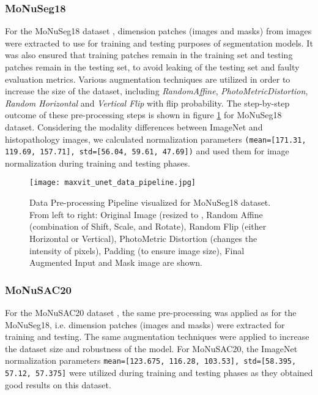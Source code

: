 \documentclass{article}
\begin{document}
\subsubsection{MoNuSeg18}

For the MoNuSeg18 dataset \cite{kumar2019multi},  dimension patches (images and masks) from  images were extracted to use for training and testing purposes of segmentation models. It was also ensured that training patches remain in the training set and testing patches remain in the testing set, to avoid leaking of the testing set and faulty evaluation metrics. Various augmentation techniques are utilized in order to increase the size of the dataset, including \textit{RandomAffine}, \textit{PhotoMetricDistortion}, \textit{Random Horizontal} and \textit{Vertical Flip} with  flip probability. The step-by-step outcome of these pre-processing steps is shown in figure \ref{fig:data-pipeline} for MoNuSeg18 \cite{kumar2019multi} dataset. Considering the modality differences between ImageNet and histopathology images, we calculated normalization parameters \texttt{(mean=[171.31, 119.69, 157.71], std=[56.04, 59.61, 47.69])} and used them for image normalization during training and testing phases.

\begin{figure}[ht!]
    \centering
    \texttt{[image: maxvit\_unet\_data\_pipeline.jpg]}
    \caption{Data Pre-processing Pipeline visualized for MoNuSeg18 dataset. From left to right: Original Image (resized to , Random Affine (combination of Shift, Scale, and Rotate), Random Flip (either Horizontal or Vertical), PhotoMetric Distortion (changes the intensity of pixels), Padding (to ensure  image size), Final Augmented Input and Mask image are shown.}
    \label{fig:data-pipeline}
\end{figure}

\subsubsection{MoNuSAC20}

For the MoNuSAC20 dataset \cite{verma2021monusac2020}, the same pre-processing was applied as for the MoNuSeg18, i.e.  dimension patches (images and masks) were extracted for training and testing. The same augmentation techniques were applied to increase the dataset size and robustness of the model. For MoNuSAC20, the ImageNet normalization parameters \texttt{mean=[123.675, 116.28, 103.53], std=[58.395, 57.12, 57.375]} were utilized during training and testing phases as they obtained good results on this dataset.
\end{document}
